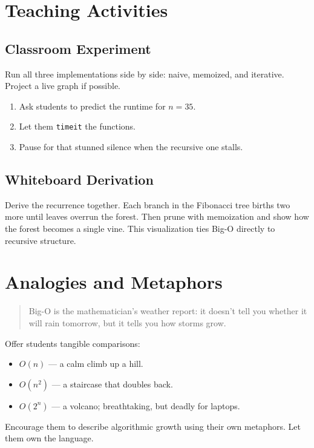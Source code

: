 \section{Teaching Activities}

\subsection*{Classroom Experiment}
Run all three implementations side by side: naive, memoized, and iterative.
Project a live graph if possible.

\begin{enumerate}
  \item Ask students to predict the runtime for $n=35$.
  \item Let them \texttt{timeit} the functions.
  \item Pause for that stunned silence when the recursive one stalls.
\end{enumerate}

\subsection*{Whiteboard Derivation}
Derive the recurrence together.
Each branch in the Fibonacci tree births two more until leaves overrun the forest.
Then prune with memoization and show how the forest becomes a single vine.
This visualization ties Big-O directly to recursive structure.

\section{Analogies and Metaphors}
\begin{quote}
Big-O is the mathematician’s weather report:
it doesn’t tell you whether it will rain tomorrow,
but it tells you how storms grow.
\end{quote}

Offer students tangible comparisons:
\begin{itemize}
  \item $O(n)$ --- a calm climb up a hill.
  \item $O(n^2)$ --- a staircase that doubles back.
  \item $O(2^n)$ --- a volcano; breathtaking, but deadly for laptops.
\end{itemize}

Encourage them to describe algorithmic growth using their own metaphors.
Let them own the language.

